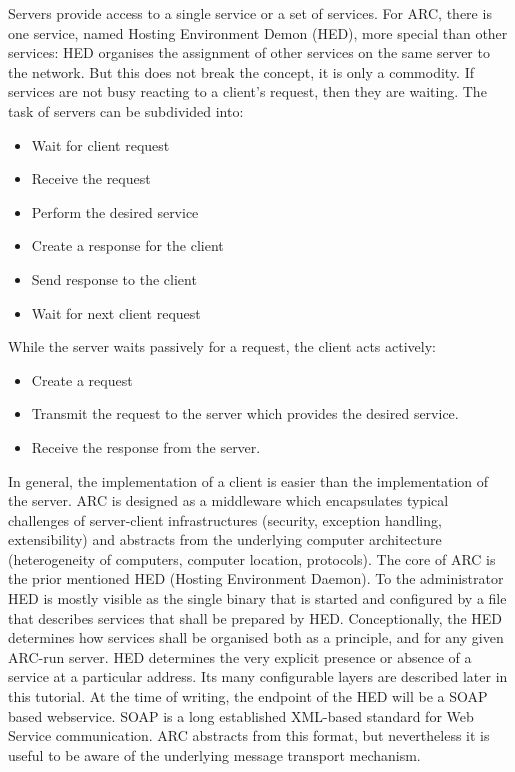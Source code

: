 Servers provide access to a single service or a set of services. For ARC, there is one service, named Hosting Environment Demon (HED), more special than other services: HED organises the assignment of other services on the same server to the network. But this does not break the concept, it is only a commodity. If services are not busy reacting to a client's request, then they are waiting. The task of servers can be subdivided into:
\begin{itemize}
 \item Wait for client request
 \item Receive the request
 \item Perform the desired service
 \item Create a response for the client
 \item Send response to the client
 \item Wait for next client request
\end{itemize}
While the server waits passively for a request, the client acts actively:
\begin{itemize}
 \item Create a request
 \item Transmit the request to the server which provides the desired service.
 \item Receive the response from the server.
 \end{itemize}
\forcelinebreak

In general, the implementation of a client is easier than the implementation of the server. 
ARC is designed as a middleware which encapsulates typical challenges of server-client infrastructures (security, exception handling, extensibility) and abstracts from the underlying computer architecture (heterogeneity of computers, computer location, protocols).
The core of ARC is the prior mentioned HED (Hosting Environment Daemon).
To the administrator HED is mostly visible as the single binary that is started and configured by a file that describes services that shall be prepared by HED.
Conceptionally, the HED determines how services shall be organised both as a principle, and for any given ARC-run server.
HED determines the very explicit presence or absence of a service at a particular address. Its many configurable layers are described later in this tutorial. 
%
At the time of writing, the endpoint of the HED will be a SOAP based webservice.
SOAP is a long established XML-based standard for Web Service communication.
ARC abstracts from this format, but nevertheless it is useful to be aware of
the underlying message transport mechanism.

